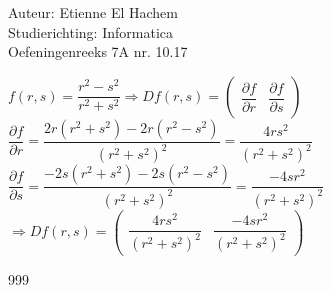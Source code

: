 \documentclass[a4paper]{article}
\begin{document}
  
\noindent \large Auteur: Etienne El Hachem \\
\noindent \large Studierichting: Informatica\\
\noindent \large Oefeningenreeks 7A nr. 10.17 \\

\medskip

\normalsize

$ f(r, s) = \dfrac{r^2 - s^2}{r^2 + s^2} \Rightarrow Df(r,s) = \begin{pmatrix} \dfrac{\partial f}{\partial r} & \dfrac{\partial f}{\partial s} \end{pmatrix} $\\

$ \dfrac{\partial f}{\partial r} = \dfrac{2r\left(r^2+s^2\right) - 2r\left(r^2-s^2\right)}{\left(r^2 + s^2\right)^2} = \dfrac{4rs^2}{\left(r^2 + s^2\right)^2} $\\

$ \dfrac{\partial f}{\partial s} = \dfrac{-2s\left(r^2+s^2\right) - 2s\left(r^2-s^2\right)}{\left(r^2 + s^2\right)^2} = \dfrac{-4sr^2}{\left(r^2 + s^2\right)^2} $\\

$ \Rightarrow Df(r,s) = \left( \begin{array}{cc} \dfrac{4rs^2}{\left(r^2 + s^2\right)^2} & \dfrac{-4sr^2}{\left(r^2 + s^2\right)^2} \end{array} \right)$\\

\begin{thebibliography}{999}
\end{thebibliography}
\end{document}
